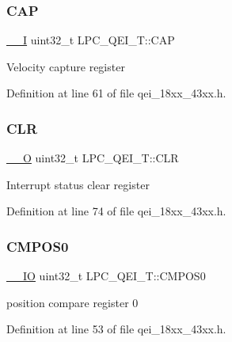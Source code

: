 \subsubsection{\texorpdfstring{C\+AP}{CAP}}
{\footnotesize\ttfamily \hyperlink{core__sc300_8h_af63697ed9952cc71e1225efe205f6cd3}{\+\_\+\+\_\+I} uint32\+\_\+t L\+P\+C\+\_\+\+Q\+E\+I\+\_\+\+T\+::\+C\+AP}

Velocity capture register 

Definition at line 61 of file qei\+\_\+18xx\+\_\+43xx.\+h.

\mbox{\label{struct_l_p_c___q_e_i___t_a909f2a48a6a21651d6baf9a3a94e6cb0}} 
\subsubsection{\texorpdfstring{C\+LR}{CLR}}
{\footnotesize\ttfamily \hyperlink{core__sc300_8h_a7e25d9380f9ef903923964322e71f2f6}{\+\_\+\+\_\+O} uint32\+\_\+t L\+P\+C\+\_\+\+Q\+E\+I\+\_\+\+T\+::\+C\+LR}

Interrupt status clear register 

Definition at line 74 of file qei\+\_\+18xx\+\_\+43xx.\+h.

\mbox{\label{struct_l_p_c___q_e_i___t_a4bb72cc566919075cb721bb123e72443}} 
\subsubsection{\texorpdfstring{C\+M\+P\+O\+S0}{CMPOS0}}
{\footnotesize\ttfamily \hyperlink{core__sc300_8h_aec43007d9998a0a0e01faede4133d6be}{\+\_\+\+\_\+\+IO} uint32\+\_\+t L\+P\+C\+\_\+\+Q\+E\+I\+\_\+\+T\+::\+C\+M\+P\+O\+S0}

position compare register 0 

Definition at line 53 of file qei\+\_\+18xx\+\_\+43xx.\+h.

\mbox{\label{struct_l_p_c___q_e_i___t_ad1272dc00c77777af8e58d6ac3b94902}} 
